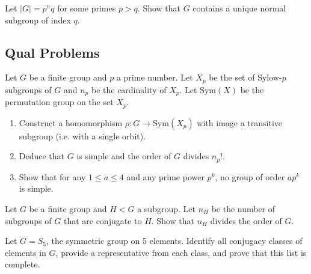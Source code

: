Let \(\left| G \right| = p^n q\) for some primes \(p > q\). Show that
\(G\) contains a unique normal subgroup of index \(q\).

\hypertarget{qual-problems}{%
\subsection{Qual Problems}\label{qual-problems}}

Let \(G\) be a finite group and \(p\) a prime number. Let \(X_p\) be the
set of Sylow-\(p\) subgroups of \(G\) and \(n_p\) be the cardinality of
\(X_p\). Let \(\mathrm{Sym}(X)\) be the permutation group on the set
\(X_p\).

\begin{enumerate}
\item
  Construct a homomorphism \(\rho: G \to \mathrm{Sym}(X_p)\) with image
  a transitive subgroup (i.e. with a single orbit).
\item
  Deduce that \(G\) is simple and the order of \(G\) divides \(n_p!\).
\item
  Show that for any \(1\leq a \leq 4\) and any prime power \(p^k\), no
  group of order \(ap^k\) is simple.
\end{enumerate}

Let \(G\) be a finite group and \(H<G\) a subgroup. Let \(n_H\) be the
number of subgroups of \(G\) that are conjugate to \(H\). Show that
\(n_H\) divides the order of \(G\).

Let \(G=S_5\), the symmetric group on 5 elements. Identify all conjugacy
classes of elements in \(G\), provide a representative from each class,
and prove that this list is complete.





